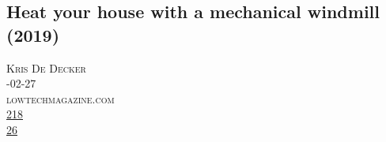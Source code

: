 \documentclass[10pt,a4paper]{article}
\begin{document}
\subsection{Heat your house with a mechanical windmill (2019)}
\noindent\begin{minipage}[t]{0.20\linewidth}
\vspace{0pt}
\noindent\textsc{\footnotesize
{\scriptsize\faUser}\space 
Kris De Decker \\
{\scriptsize\faCalendar}-02-27 \\
{\scriptsize\faGlobe}\space 
lowtechmagazine.com \\
{\scriptsize\faThumbsOUp}\space 
\href{http://news.ycombinator.com/item?id=37201688\&utm\_term=comment}{218} \\
{\scriptsize\faComments}\space 
\href{http://news.ycombinator.com/item?id=37201688\&utm\_term=comment}{26} \\
}
\end{minipage} 
\end{document}

